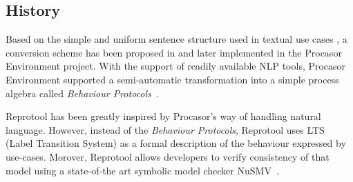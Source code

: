 \subsection{History}
Based on the simple and uniform sentence structure used in textual use cases \cite{Cockburn:2000:WEU:517669}, a conversion scheme has been proposed in \cite{MenclDeriving,MenclImprovedDeriving} and later implemented in the Procasor Environment project. With the support of readily available NLP tools, Procasor Environment supported a semi-automatic transformation into a simple process algebra called \emph{Behaviour Protocols}~\cite{BehaviourProtocols}.

Reprotool has been greatly inspired by Procasor's way of handling natural language.
However, instead of the \emph{Behaviour Protocols}, Reprotool uses LTS (Label Transition System) as a formal description of the behaviour expressed by use-cases. Morover, Reprotool allows developers to verify consistency of that model using a state-of-the art symbolic model checker NuSMV~\cite{NuSMV-CAV02}.